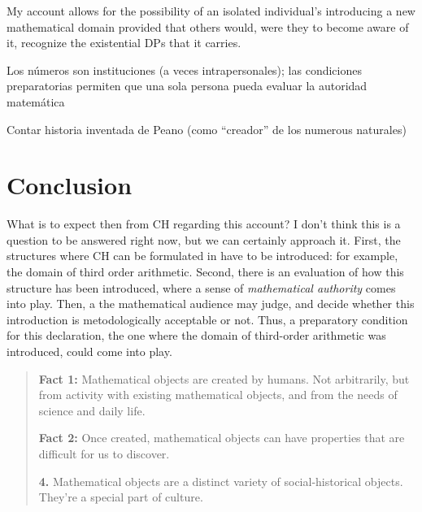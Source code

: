 \documentclass[11pt,a4paper]{article}
\begin{document}
My account allows for the possibility of an isolated individual's introducing a new mathematical domain provided that others would, were they to become aware of it, recognize the existential DPs that it carries. \textcite[27]{Cole2013}

Los números son instituciones (a veces intrapersonales); las condiciones preparatorias permiten que una sola persona pueda evaluar la autoridad matemática 

Contar historia inventada de Peano (como ``creador'' de los numerous naturales) 


\section{Conclusion}
What is to expect then from CH regarding this account? I don't think this is a question to be answered right now, but we can certainly approach it. First, the structures where CH can be formulated in have to be introduced: for example, the domain of third order arithmetic. Second, there is an evaluation of how this structure has been introduced, where a sense of \textit{mathematical authority} comes into play. Then, a the mathematical audience may judge, and decide whether this introduction is metodologically acceptable or not. Thus, a preparatory condition for this declaration, the one where the domain of third-order arithmetic was introduced, could come into play. 

\begin{quote}
\textbf{Fact 1:} Mathematical objects are created by humans. Not arbitrarily, but from activity with existing mathematical objects, and from the needs of science and daily life.

\textbf{Fact 2:} Once created, mathematical objects can have properties that are difficult for us to discover.
\par\hfill\parencite[p.~16]{Hersh1997}

\textbf{4.} Mathematical objects are a distinct variety of social-historical objects. They're a special part of culture.
\par\hfill\parencite[p.~22]{Hersh1997}
\end{quote}

\printbibliography
\end{document}
